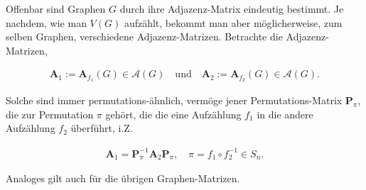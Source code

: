        \begin{remark} \label{rem:graph_matrix_similarity}

            Offenbar sind Graphen $G$ durch ihre Adjazenz-Matrix eindeutig bestimmt.
            Je nachdem, wie man $V(G)$ aufzählt, bekommt man aber möglicherweise, zum selben Graphen, verschiedene Adjazenz-Matrizen.
            Betrachte die Adjazenz-Matrizen,

            \begin{align*}
                \mathbf A_1 := \mathbf A_{f_1}(G) \in \mathcal A(G)
                \quad
                \text{und}
                \quad
                \mathbf A_2 :=  \mathbf A_{f_2}(G) \in \mathcal A(G).
            \end{align*}

            Solche sind immer permutations-ähnlich, vermöge jener Permutations-Matrix $\mathbf P_\pi$, die zur Permutation $\pi$ gehört, die die eine Aufzählung $f_1$ in die andere Aufzählung $f_2$ überführt, i.Z.

            \begin{align*}
                \mathbf A_1 = \mathbf P_\pi^{-1} \mathbf A_2 \mathbf P_\pi,
                \quad
                \pi = f_1 \circ f_2^{-1} \in S_n.
            \end{align*}

            Analoges gilt auch für die übrigen Graphen-Matrizen.

        \end{remark}

